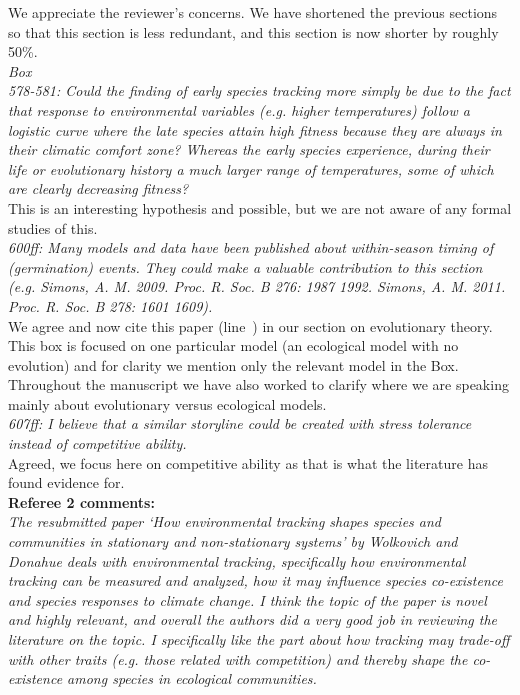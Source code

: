 \documentclass[11pt]{article}
\newcommand{\lr}[1]{line~\lineref{#1}}
\begin{document}
We appreciate the reviewer's concerns. We have shortened the previous sections so that this section is less redundant, and this section is now shorter by roughly 50\%.\\

\emph{Box\\
578-581: Could the finding of early species tracking more simply be due to the fact that
response to environmental variables (e.g. higher temperatures) follow a logistic curve where
the late species attain high fitness because they are always in their climatic comfort zone?
Whereas the early species experience, during their life or evolutionary history a much larger
range of temperatures, some of which are clearly decreasing fitness?}\\

This is an interesting hypothesis and possible, but we are not aware of any formal studies of this.\\

\emph{600ff: Many models and data have been published about within-season timing of (germination)
events. They could make a valuable contribution to this section (e.g. Simons, A. M. 2009.
Proc. R. Soc. B 276: 1987 1992. Simons, A. M. 2011. Proc. R. Soc. B 278: 1601 1609).}\\

We agree and now cite this paper (\lr{simonsref1}) in our section on evolutionary theory. This box is focused on one particular model (an ecological model with no evolution) and for clarity we mention only the relevant model in the Box. Throughout the manuscript we have also worked to clarify where we are speaking mainly about evolutionary versus ecological models. \\

\emph{607ff: I believe that a similar storyline could be created with stress tolerance instead of
competitive ability.}\\

Agreed, we focus here on competitive ability as that is what the literature has found evidence for.\\

{\bf Referee 2 comments:} \\

\emph{The resubmitted paper `How environmental tracking shapes species and communities in
stationary and non-stationary systems' by Wolkovich and Donahue deals with environmental
tracking, specifically how environmental tracking can be measured and analyzed, how it may
influence species co-existence and species responses to climate change. I think the topic of
the paper is novel and highly relevant, and overall the authors did a very good job in
reviewing the literature on the topic. I specifically like the part about how tracking may
trade-off with other traits (e.g. those related with competition) and thereby shape the co-
existence among species in ecological communities.}\\
\end{document}
